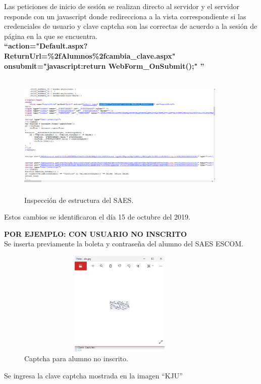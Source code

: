 	\noindent Las peticiones de inicio de sesión se realizan directo al servidor y el servidor responde con un javascript donde redirecciona a la vista correspondiente si las credenciales de usuario y clave captcha son las correctas de acuerdo a la sesión de página en la que se encuentra.\\
	\textbf{“action="Default.aspx?ReturnUrl=\%2fAlumnos\%2fcambia\_clave.aspx" onsubmit="javascript:return WebForm\_OnSubmit();" ”}
	
	\begin{figure} [hbt!]
		\centering
		\includegraphics[width=10cm, height=6cm]{Imagenes/Crawler/ASP1}
		\caption{Inspección de estructura del SAES.}
		\label{asp1}
	\end{figure}
	\noindent Estos cambios se identificaron el día 15 de octubre del 2019.
\pagebreak
	
	\textbf{POR EJEMPLO: CON USUARIO NO INSCRITO}\\
	\noindent Se inserta previamente la boleta y contraseña del alumno del SAES ESCOM.
	
	\begin{figure}[hbt!]
		\centering
		\includegraphics[width=10cm, height=5cm]{Imagenes/Crawler/ImagenloginNoinscrito}
		\caption{Captcha para alumno no inscrito.}
		\label{imagenloginnoinscrito}
	\end{figure}
	
	Se ingresa la clave captcha mostrada en la imagen “KJU”
	
